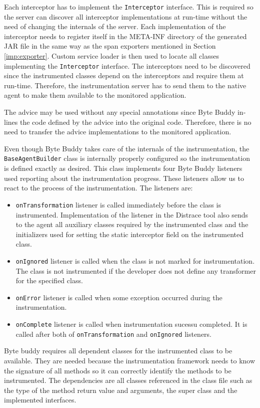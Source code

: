 Each interceptor has to implement the \texttt{Interceptor} interface. This is required so the server can discover all interceptor implementations at run-time without the need of changing the internals of the server. Each implementation of the interceptor needs to register itself in the META-INF directory of the generated JAR file in the same way as the span exporters mentioned in Section \ref{imp:exporter}. Custom service loader is then used to locate all classes implementing the \texttt{Interceptor} interface. The interceptors need to be discovered since the instrumented classes depend on the interceptors and require them at run-time. Therefore, the instrumentation server has to send them to the native agent to make them available to the monitored application.

The advice may be used without any special annotations since Byte Buddy in-lines the code defined by the advice into the original code. Therefore, there is no need to transfer the advice implementations to the monitored application.

Even though Byte Buddy takes care of the internals of the instrumentation, the \texttt{BaseAgentBuilder} class is internally properly configured so the instrumentation is defined exactly as desired. This class implements four Byte Buddy listeners used reporting about the instrumentation progress. These listeners allow us to react to the process of the instrumentation. The listeners are:
\begin{itemize}
	\item \texttt{onTransformation} listener is called immediately before the class is instrumented. Implementation of the listener in the Distrace tool also sends to the agent all auxiliary classes required by the instrumented class and the initializers used for setting the static interceptor field on the instrumented class.
	\item \texttt{onIgnored} listener is called when the class is not marked for instrumentation. The class is not instrumented if the developer does not define any transformer for the specified class.
	\item \texttt{onError} listener is called when some exception occurred during the instrumentation.
	\item \texttt{onComplete} listener is called when instrumentation sucessu completed. It is called after both of \texttt{onTransformation} and \texttt{onIgnored} listeners.
\end{itemize}

Byte buddy requires all dependent classes for the instrumented class to be available. They are needed because the instrumentation framework needs to know the signature of all methods so it can correctly identify the methods to be instrumented. The dependencies are all classes referenced in the class file such as the type of the method return value and arguments, the super class and the implemented interfaces. 

